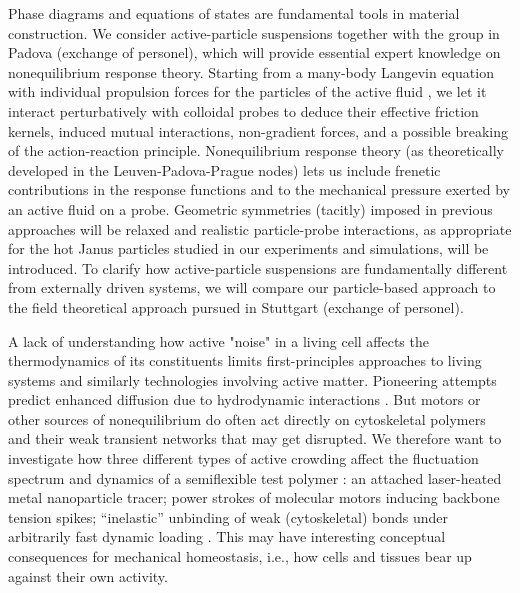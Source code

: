 \begin{workpackage}[id=WPactive,wphases=0-48,
  short=Active Particle Suspensions,%
  title=Probing active particle suspensions with colloids and polymers,
  lead=ULEI,
  ULEIRM=96,UNIPDRM=6,USTUTTRM=2]
\begin{tasklist}
\begin{task}[title=Nonequilibrium equations of state (NEOS),id=task1,PM=8,lead=ULEI,partners={UNIPD,USTUTT},
wphases=0-48!0.5]
Phase diagrams and equations of states are fundamental tools in material construction.
We consider active-particle suspensions together with the group in Padova (exchange of personel), 
which will provide essential expert knowledge on nonequilibrium response theory.
%
Starting from a many-body Langevin equation with individual propulsion forces for the
particles of the active fluid \cite{solon-etal:2015}, we let it interact perturbatively with colloidal probes to
deduce their effective friction kernels, induced mutual interactions, non-gradient forces, and a possible breaking of
the action-reaction principle.  
%
Nonequilibrium response theory (as theoretically developed in the Leuven-Padova-Prague nodes) lets us include 
frenetic contributions in the response functions \cite{baiesi-wynants:2009} and to the mechanical pressure 
exerted by an active fluid on a probe. 
%
Geometric symmetries (tacitly) imposed in previous approaches will be relaxed and realistic particle-probe interactions, 
as appropriate for the hot Janus particles studied in our experiments and simulations, will be introduced.
%
To clarify how active-particle suspensions are fundamentally different from externally driven systems,
we will compare our particle-based approach to the field theoretical approach pursued in Stuttgart (exchange of personel). 

\end{task}

\begin{task}[title=Active Crowding,id=task2,lead=ULEI,partners={KUL},wphases=0-48!0.5]
A lack of understanding how active "noise" in a living cell affects the thermodynamics
of its constituents limits first-principles approaches to living systems and 
similarly technologies involving active matter.
Pioneering attempts predict enhanced diffusion due to hydrodynamic interactions \cite{mikhailov-kapral:2015}.
%
But motors or other sources of nonequilibrium do often act directly on cytoskeletal 
polymers and their weak transient networks that may get disrupted. We therefore want to investigate 
how three different types of active crowding affect the fluctuation spectrum and dynamics of a 
semiflexible test polymer \cite{otto-etal:2013}:
an attached laser-heated metal nanoparticle tracer; power strokes of molecular
motors inducing backbone tension spikes; ``inelastic''  \cite{gralka-kroy:2015}
unbinding of weak (cytoskeletal) bonds under arbitrarily fast dynamic loading \cite{bullerjahn-sturm-kroy:2014}.
%
This may have interesting conceptual consequences for mechanical homeostasis, i.e., how cells and tissues bear up against 
their own activity.   


\end{task}
\end{tasklist}
\end{workpackage}
